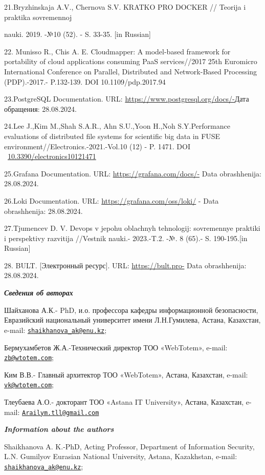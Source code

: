 \documentclass[
]{article}
\begin{document}
21.Bryzhinskaja A.V., Chernova S.V. KRATKO PRO DOCKER // Teorija i
praktika sovremennoj

nauki. 2019. -№10 (52). - S. 33-35. {[}in Russian{]}

22. Munisso R., Chis A. E. Cloudmapper: A model-based framework for
portability of cloud applications consuming PaaS services//2017 25th
Euromicro International Conference on Parallel, Distributed and
Network-Based Processing (PDP).-2017.- P.132-139. DOI
10.1109/pdp.2017.94

23.PostgreSQL Documentation. URL:
\url{https://www.postgresql.org/docs/-}Дата обращения: 28.08.2024.

24.Lee J.,Kim M.,Shah S.A.R., Ahn S.U.,Yoon H.,Noh S.Y.Performance
evaluations of distributed file systems for scientific big data in FUSE
environment//Electronics.-2021.-Vol.10 (12) - P. 1471. DOI
~\href{https://doi.org/10.3390/electronics10121471}{10.3390/electronics10121471}

25.Grafana Documentation. URL: \url{https://grafana.com/docs/-} Data
obrashhenija: 28.08.2024.

26.Loki Documentation. URL: \url{https://grafana.com/oss/loki/} - Data
obrashhenija: 28.08.2024.

27.Tjumencev D. V. Devops v jepohu oblachnyh tehnologij: sovremennye
praktiki i perspektivy razvitija //Vestnik nauki.- 2023.-T.2. -№. 8
(65).- S. 190-195.{[}in Russian{]}

28. BULT. {[}Электронный ресурс{]}. URL: \url{https://bult.pro-} Data
obrashhenija: 28.08.2024.

\emph{\textbf{Сведения об авторах}}

Шайханова А.К.- PhD, и.о. профессора кафедры информационной
безопасности, Евразийский национальный университет имени Л.Н.Гумилева,
Астана, Казахстан, e-mail:
\href{mailto:shaikhanova_ak@enu.kz}{\nolinkurl{shaikhanova\_ak@enu.kz}};

Бермухамбетов Ж.А.-Технический директор ТОО «WebTotem», e-mail:
\href{mailto:zb@wtotem.com}{\nolinkurl{zb@wtotem.com}};

Ким В.В.- Главный архитектор ТОО «WebTotem», Астана, Казахстан, e-mail:
\href{mailto:vk@wtotem.com}{\nolinkurl{vk@wtotem.com}};

Тлеубаева А.О.- докторант ТОО «Astana IT University», Астана, Казахстан,
e-mail:
\href{mailto:Arailym.tll@gmail.com}{\nolinkurl{Arailym.tll@gmail.com}}

\emph{\textbf{Information about the authors}}

Shaikhanova A. K.-PhD, Acting Professor, Department of Information
Security, L.N. Gumilyov Eurasian National University, Astana,
Kazakhstan, e-mail:
\href{mailto:shaikhanova_ak@enu.kz}{\nolinkurl{shaikhanova\_ak@enu.kz}};
\end{document}
